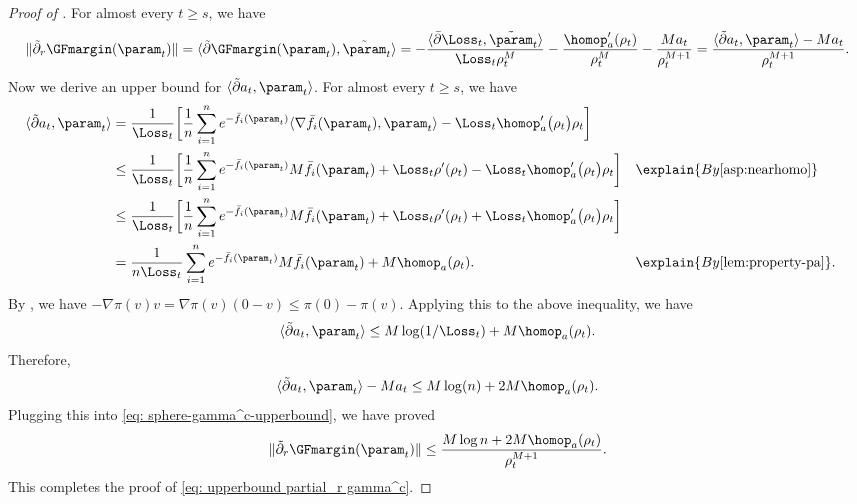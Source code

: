 \begin{proof}[Proof of ]
For almost every $t\ge s$, we have
\begin{align}
\label{eq: sphere-gamma^c-upperbound}
\| \tilde \partial_r \GFmargin(\param_t)\| 
= \langle \tilde \partial \GFmargin(\param_t), \tilde{\param}_t \rangle = - \frac{ \langle\bar \partial \Loss_t, \tilde \param_t  \rangle }{\Loss_t \rho_t^M} - \frac{\homop_a^\prime (\rho_t)}{\rho_t^M} - \frac{Ma_t}{\rho_t^{M+1}} = \frac{\langle \tilde \partial a_t, \param_t \rangle - M a_t }{\rho_t^{M+1}}.  
\end{align}
Now we derive an upper bound 
for $\langle \tilde \partial  a_t, \param_t \rangle$.
For almost every $t\ge s$, we have 
\begin{align*}
    \langle \tilde \partial a_t, \param_t \rangle  
    & = \frac{1}{ \Loss_t}  \bigg [\frac{1}{n}\sum_{i=1}^n e^{-\bar f_i(\param_t )} \langle \nabla \bar f_i (\param_t ), \param_t \rangle - \Loss_t \homop_a^\prime \big( \rho_t \big) \rho_t  \bigg]\\  
    & \le \frac{1}{ \Loss_t}\bigg [\frac{1}{n}\sum_{i=1}^n e^{-\bar f_i(\param_t )} M\bar f_i(\param_t) + \Loss_t \rho ^\prime (\rho_t) - \Loss_t \homop_a^\prime \big( \rho_t \big) \rho_t  \bigg] &&\explain{ By \Cref{asp:nearhomo} } \\
    & \le  \frac{1}{ \Loss_t} \bigg [\frac{1}{n}\sum_{i=1}^n e^{-\bar f_i(\param_t )} M\bar f_i(\param_t) + \Loss_t \rho ^\prime (\rho_t) + \Loss_t \homop_a^\prime \big( \rho_t \big) \rho_t  \bigg]  \\ 
    & = \frac{1}{ n\Loss_t}\sum_{i=1}^n e^{-\bar f_i(\param_t )} M\bar f_i(\param_t) +  M \homop_a(\rho_t).  &&\explain{ By \Cref{lem:property-pa} }. 
\end{align*}
By , we have $ -\nabla \pi (v) v = \nabla \pi(v) (0 -v) \le \pi(0) - \pi(v)$. 
Applying this to the above inequality, we have 
\[
    \langle \tilde \partial  a_t, \param_t  \rangle \le  M  \log(1 / \Loss_t) + M \homop_a(\rho_t). 
\]
Therefore, 
\[
    \langle \tilde \partial a_t, \param_t  \rangle - M a_t \le M \log(n) + 2M \homop_a(\rho_t).  
\]
Plugging this into \eqref{eq: sphere-gamma^c-upperbound}, we have proved  
\[
    \| \tilde \partial_r \GFmargin(\param_t)\| \le \frac{M \log n + 2M \homop_a(\rho_t)}{\rho_t^{M+1}}.
\]
This completes the proof of \eqref{eq: upperbound partial_r gamma^c}. 


\end{proof}
